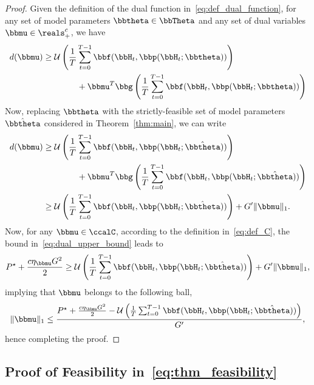 \begin{proof}
Given the definition of the dual function in~\eqref{eq:def_dual_function}, for any set of model parameters $\bbtheta\in\bbTheta$ and any set of dual variables $\bbmu\in\reals_+^c$, we have
\begin{align}
d(\bbmu) &\geq \mathcal{U}\left( \frac{1}{T} \sum_{t=0}^{T-1} \bbf(\bbH_t, \bbp(\bbH_t;\bbtheta)) \right)\nonumber \\
   &\qquad\qquad+ \bbmu^T \bbg\left( \frac{1}{T} \sum_{t=0}^{T-1} \bbf(\bbH_t, \bbp(\bbH_t;\bbtheta)) \right)
\end{align}
Now, replacing $\bbtheta$ with the strictly-feasible set of model parameters $\hat{\bbtheta}$ considered in Theorem~\ref{thm:main}, we can write
\begin{align}
d(\bbmu) &\geq \mathcal{U}\left( \frac{1}{T} \sum_{t=0}^{T-1} \bbf(\bbH_t, \bbp(\bbH_t;\hat{\bbtheta})) \right)\nonumber \\
   &\qquad\qquad+ \bbmu^T \bbg\left( \frac{1}{T} \sum_{t=0}^{T-1} \bbf(\bbH_t, \bbp(\bbH_t;\hat{\bbtheta})) \right)\\
&\geq \mathcal{U}\left( \frac{1}{T} \sum_{t=0}^{T-1} \bbf(\bbH_t, \bbp(\bbH_t;\hat{\bbtheta})) \right) + G' \| \bbmu \|_1.\label{eq:dual_upper_bound}
\end{align}
Now, for any $\bbmu\in\ccalC$, according to the definition in~\eqref{eq:def_C}, the bound in~\eqref{eq:dual_upper_bound} leads to
\begin{align}
P^{\star} + \frac{c\eta_{\bbmu}G^2}{2}  \geq \mathcal{U}\left( \frac{1}{T} \sum_{t=0}^{T-1} \bbf(\bbH_t, \bbp(\bbH_t;\hat{\bbtheta})) \right) + G' \| \bbmu \|_1,
\end{align}
implying that $\bbmu$ belongs to the following ball,
\begin{align}
\| \bbmu \|_1 \leq \frac{P^{\star} + \frac{c\eta_{\bbmu}G^2}{2} - \mathcal{U}\left( \frac{1}{T} \sum_{t=0}^{T-1} \bbf(\bbH_t, \bbp(\bbH_t;\hat{\bbtheta})) \right)}{G'},
\end{align}
hence completing the proof.


\end{proof}

\subsection{Proof of Feasibility in~\eqref{eq:thm_feasibility}}\label{appx:proof_feasibility}

